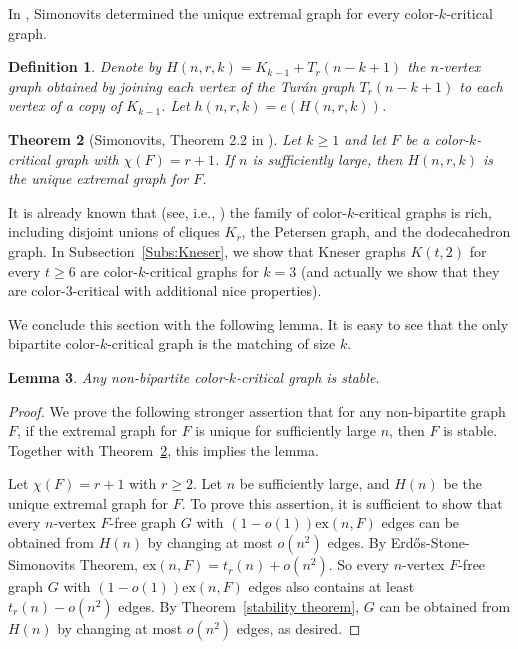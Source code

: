 \documentclass[10pt]{article}
\newtheorem{theorem}{Theorem}[section]
\newtheorem{definition}[theorem]{Definition}
\newtheorem{lemma}[theorem]{Lemma}
\def\ex{\mathrm{ex}}
\begin{document}
In \cite{Simonovits1974}, Simonovits determined the unique extremal graph for every color-$k$-critical graph.

\begin{definition}
Denote by $H(n,r,k)=K_{k-1}+ T_r(n-k+1)$ the $n$-vertex graph obtained by joining each vertex of the Tur\'{a}n graph $T_r(n-k+1)$ to each vertex of a copy of $K_{k-1}$. Let $h(n,r,k)=e(H(n,r,k))$.
\end{definition}

\begin{theorem}[Simonovits, Theorem 2.2 in \cite{Simonovits1974}]\label{extremal graph for mk-critical graph}
Let $k\geq 1$ and let $F$ be a color-$k$-critical graph with $\chi(F)=r+1$.
If $n$ is sufficiently large, then $H(n,r,k)$ is the unique extremal graph for $F$.
\end{theorem}

It is already known that (see, i.e., \cite{Simonovits1974,Simonovits1999})
the family of color-$k$-critical graphs is rich, including disjoint unions of cliques $K_r$, the Petersen graph, and the dodecahedron graph.
In Subsection~\ref{Subs:Kneser}, we show that Kneser graphs $K(t,2)$ for every $t\geq 6$ are color-$k$-critical graphs for $k=3$ (and actually we show that they are color-$3$-critical with additional nice properties).

We conclude this section with the following lemma. 
It is easy to see that the only bipartite color-$k$-critical graph is the matching of size $k$.

\begin{lemma}\label{lem:color-k-critical-is-stable}
Any non-bipartite color-$k$-critical graph is stable.
\end{lemma}

\begin{proof}
We prove the following stronger assertion that for any non-bipartite graph $F$, if the extremal graph for $F$ is unique for sufficiently large $n$, then $F$ is stable.
Together with Theorem~\ref{extremal graph for mk-critical graph}, this implies the lemma. 

Let $\chi(F)=r+1$ with $r\geq 2$. Let $n$ be sufficiently large, and $H(n)$ be the unique extremal graph for $F$. 
To prove this assertion, it is sufficient to show that every $n$-vertex $F$-free graph $G$ with $(1-o(1))\ex(n,F)$ edges can be obtained from $H(n)$ by changing at most $o(n^2)$ edges.
By Erd\H{o}s-Stone-Simonovits Theorem, $\ex(n,F)=t_r(n)+o(n^2)$.
So every $n$-vertex $F$-free graph $G$ with $(1-o(1))\ex(n,F)$ edges also contains at least $t_r(n)-o(n^2)$ edges.
By Theorem~\ref{stability theorem}, $G$ can be obtained from $H(n)$ by changing at most $o(n^2)$ edges, as desired.
\end{proof}
\end{document}

